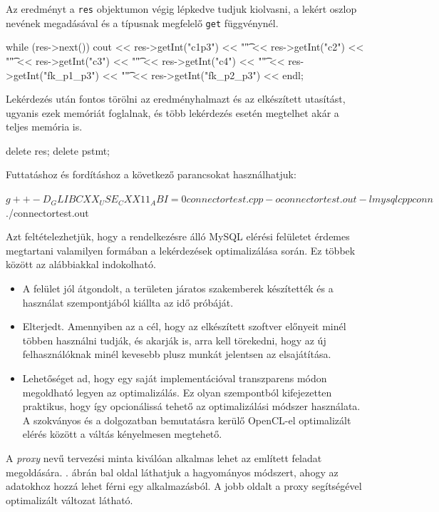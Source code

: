 Az eredményt a \texttt{res} objektumon végig lépkedve tudjuk kiolvasni, a lekért oszlop nevének megadásával és a típusnak megfelelő \texttt{get} függvénynél.
\begin{cpp}
while (res->next())
cout << res->getInt("c1p3") << "\t" << res->getInt("c2") << "\t"
<< res->getInt("c3") << "\t" << res->getInt("c4") << "\t"
<< res->getInt("fk_p1_p3") << "\t" << res->getInt("fk_p2_p3") 
<< endl;
\end{cpp}
Lekérdezés után fontos törölni az eredményhalmazt és az elkészített utasítást, ugyanis ezek memóriát foglalnak, és több lekérdezés esetén megtelhet akár a teljes memória is.
\begin{cpp}
delete res;
delete pstmt;
\end{cpp}
Futtatáshoz és fordításhoz a következő parancsokat használhatjuk: 
\begin{python}
$ g++ -D_GLIBCXX_USE_CXX11_ABI=0 connectortest.cpp 
-o connectortest.out -lmysqlcppconn
$ ./connectortest.out
\end{python}


Azt feltételezhetjük, hogy a rendelkezésre álló MySQL elérési felületet érdemes megtartani valamilyen formában a lekérdezések optimalizálása során. Ez többek között az alábbiakkal indokolható.
\begin{itemize}
	\item A felület jól átgondolt, a területen járatos szakemberek készítették és a használat szempontjából kiállta az idő próbáját.
	\item Elterjedt. Amennyiben az a cél, hogy az elkészített szoftver előnyeit minél többen használni tudják, és akarják is, arra kell törekedni, hogy az új felhasználóknak minél kevesebb plusz munkát jelentsen az elsajátítása.
	\item Lehetőséget ad, hogy egy saját implementációval transzparens módon megoldható legyen az optimalizálás. Ez olyan szempontból kifejezetten praktikus, hogy így opcionálissá tehető az optimalizálási módszer használata. A szokványos és a dolgozatban bemutatásra kerülő OpenCL-el optimalizált elérés között a váltás kényelmesen megtehető.
\end{itemize}

A \textit{proxy} nevű tervezési minta kiválóan alkalmas lehet az említett feladat megoldására. . ábrán bal oldal láthatjuk a hagyományos módszert, ahogy az adatokhoz hozzá lehet férni egy alkalmazásból. A jobb oldalt a proxy segítségével optimalizált változat látható.

